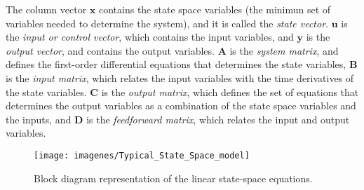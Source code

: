 \documentclass[a4paper,12pt,oneside]{book}
\begin{document}
The column vector $\boldsymbol{x}$ contains the state space variables (the minimun set of variables needed to determine the system), and it is called the \textit{state vector}. $\boldsymbol{u}$ is the \textit{input or control vector}, which contains the input variables, and $\boldsymbol{y}$ is the \textit{output vector}, and contains the output variables. $\boldsymbol{A}$ is the \textit{system matrix}, and defines the first-order differential equations that determines the state variables, $\boldsymbol{B}$ is the \textit{input matrix}, which relates the input variables with the time derivatives of the state variables. $\boldsymbol{C}$ is the \textit{output matrix}, which defines the set of equations that determines the output variables as a combination of the state space variables and the inputs, and $\boldsymbol{D}$ is the \textit{feedforward matrix}, which relates the input and output variables.

\begin{figure}[htbp]
    \centering
\texttt{[image: imagenes/Typical\_State\_Space\_model]}
\caption{Block diagram representation of the linear state-space equations.}
\label{diagrama state space}
\end{figure}


\end{document}
